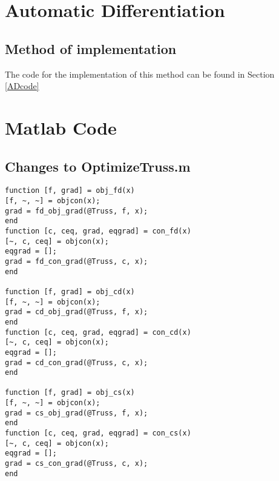 \documentclass{article}
\begin{document}
\section{Automatic Differentiation}
\subsection{Method of implementation}
The code for the implementation of this method can be found in Section \ref{ADcode}

%

\section{Matlab Code}\label{sec:code}
\subsection{Changes to OptimizeTruss.m}\label{sec:optTrussChanges}
\begin{verbatim}
function [f, grad] = obj_fd(x)
[f, ~, ~] = objcon(x);
grad = fd_obj_grad(@Truss, f, x);
end
function [c, ceq, grad, eqgrad] = con_fd(x)
[~, c, ceq] = objcon(x);
eqgrad = [];
grad = fd_con_grad(@Truss, c, x);
end

function [f, grad] = obj_cd(x)
[f, ~, ~] = objcon(x);
grad = cd_obj_grad(@Truss, f, x);
end
function [c, ceq, grad, eqgrad] = con_cd(x)
[~, c, ceq] = objcon(x);
eqgrad = [];
grad = cd_con_grad(@Truss, c, x);
end

function [f, grad] = obj_cs(x)
[f, ~, ~] = objcon(x);
grad = cs_obj_grad(@Truss, f, x);
end
function [c, ceq, grad, eqgrad] = con_cs(x)
[~, c, ceq] = objcon(x);
eqgrad = [];
grad = cs_con_grad(@Truss, c, x);
end
\end{verbatim}
\end{document}
